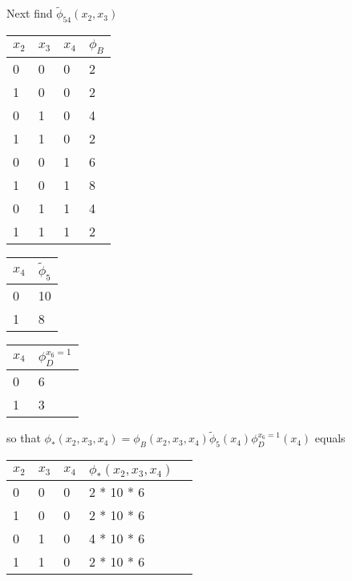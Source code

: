 \begin{exenumerate}
\begin{solution}
    Next find $\tilde{\phi}_{54}(x_2, x_3)$
    \begin{center}
      \begin{tabular}{llll}
        \toprule
        $x_2$ & $x_3$ & $x_4$ & $\phi_B$\\
        \midrule
        0 & 0 & 0 & 2 \\
        1 & 0 & 0 & 2 \\
        0 & 1 & 0 & 4 \\
        1 & 1 & 0 & 2 \\
        0 & 0 & 1 & 6 \\
        1 & 0 & 1 & 8 \\
        0 & 1 & 1 & 4 \\
        1 & 1 & 1 & 2 \\
        \bottomrule
      \end{tabular}\hspace{2ex}
      \begin{tabular}{ll}
        \toprule
        $x_4$ & $\tilde{\phi}_5$\\
        \midrule
        0 & 10 \\
        1 & 8 \\
        \bottomrule
      \end{tabular}\hspace{2ex}
      \begin{tabular}{ll}
        \toprule
        $x_4$ & $\phi_D^{x_6=1}$\\
        \midrule
        0 & 6 \\
        1 & 3 \\
        \bottomrule
      \end{tabular}
    \end{center}
      so that $\phi_*(x_2,x_3,x_4) = \phi_B(x_2, x_3, x_4) \tilde{\phi}_5(x_4) \phi_D^{x_6=1}(x_4)$ equals
      \begin{center}
        \begin{tabular}{lllll}
          \toprule
          $x_2$ & $x_3$ & $x_4$ & $\phi_*(x_2,x_3,x_4)$\\
          \midrule
          0 & 0 & 0 & 2 * 10 * 6 \\ 
          1 & 0 & 0 & 2 * 10 * 6 \\
          0 & 1 & 0 & 4 * 10 * 6 \\
          1 & 1 & 0 & 2 * 10 * 6 \\

\end{tabular}
\end{center}
\end{solution}
\end{exenumerate}
